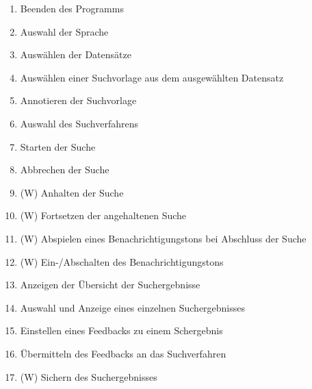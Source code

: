 \begin{enumerate} [label=\bfseries /F \arabic*0/]
	\item Beenden des Programms
	\item Auswahl der Sprache
	\item Ausw\"ahlen der Datens\"atze
	\item Ausw\"ahlen einer Suchvorlage aus dem ausgew\"ahlten Datensatz
	\item Annotieren der Suchvorlage
	\item Auswahl des Suchverfahrens
	\item Starten der Suche
	\item Abbrechen der Suche
	\item (W) Anhalten der Suche
	\item (W) Fortsetzen der angehaltenen Suche
	\item (W) Abspielen eines Benachrichtigungstons bei Abschluss der Suche
	\item (W) Ein-/Abschalten des Benachrichtigungstons
	\item Anzeigen der \"Ubersicht der Suchergebnisse
	\item Auswahl und Anzeige eines einzelnen Suchergebnisses
	\item Einstellen eines Feedbacks zu einem Schergebnis
	\item \"Ubermitteln des Feedbacks an das Suchverfahren
	\item (W) Sichern des Suchergebnisses
\end{enumerate}
